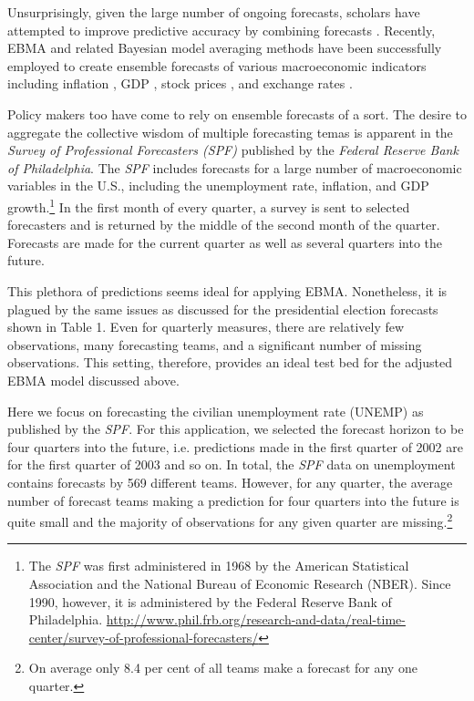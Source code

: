 \documentclass[12pt,fullpage,endnotes]{article}
\begin{document}
Unsurprisingly, given the large number of ongoing forecasts, scholars
have attempted to improve predictive accuracy by combining forecasts
\citet{Bates:1969, Palm:Zellner:1992, Elliott:Timmermann:2008}.
Recently, EBMA and related Bayesian model averaging methods have been
successfully employed to create ensemble forecasts of various
macroeconomic indicators including inflation
\citep{Koop:2010,Wright:2009}, GDP \citep{Billio:2010}, stock prices
\citep{Billio:2011}, and exchange rates \citep{Wright:2008}.

Policy makers too have come to rely on ensemble forecasts of a sort.
The desire to aggregate the collective wisdom of multiple forecasting
temas is apparent in the \textit{Survey of Professional Forecasters
  (SPF)} published by the \textit{Federal Reserve Bank of
  Philadelphia}.  The \textit{SPF} includes forecasts for a large
number of macroeconomic variables in the U.S., including the
unemployment rate, inflation, and GDP growth.\footnote{The
  \textit{SPF} was first administered in 1968 by the American
  Statistical Association and the National Bureau of Economic Research
  (NBER).  Since 1990, however, it is administered by the Federal
  Reserve Bank of Philadelphia.
  \url{http://www.phil.frb.org/research-and-data/real-time-center/survey-of-professional-forecasters/}}
In the first month of every quarter, a survey is sent to selected
forecasters and is returned by the middle of the second month of the
quarter. Forecasts are made for the current quarter as well as several
quarters into the future.

This plethora of predictions seems ideal for applying EBMA.  Nonetheless,
it is plagued by the same issues as discussed for the presidential
election forecasts shown in Table 1.  Even for quarterly measures,
there are relatively few observations, many forecasting teams, and a
significant number of missing observations.  This setting, therefore,
provides an ideal test bed for the adjusted EBMA model discussed
above.

Here we focus on forecasting the civilian unemployment rate (UNEMP) as
published by the \textit{SPF}. For this application, we selected the
forecast horizon to be four quarters into the future, i.e. predictions
made in the first quarter of 2002 are for the first quarter of 2003
and so on. In total, the \textit{SPF} data on unemployment contains
forecasts by 569 different teams. However, for any quarter, the
average number of forecast teams making a prediction for four quarters
into the future is quite small and the majority of observations for
any given quarter are missing.\footnote{On average only 8.4 per cent
  of all teams make a forecast for any one quarter.}
\end{document}
